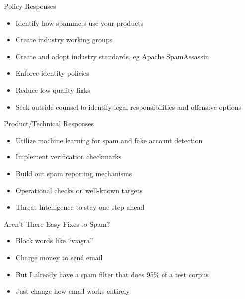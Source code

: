 \documentclass[nobackground,dvipsnames,table]{beamer}
\begin{document}
\begin{frame}{Policy Responses}
    \begin{itemize}
        \item Identify how spammers use your products
        \item Create industry working groups
        \item Create and adopt industry standards, eg Apache SpamAssassin
        \item Enforce identity policies
        \item Reduce low quality links
        \item Seek outside counsel to identify legal responsibilities and offensive options
    \end{itemize}
\end{frame}

\begin{frame}{Product/Technical Responses}
    \begin{itemize}
        \item Utilize machine learning for spam and fake account detection
        \item Implement verification checkmarks
        \item Build out spam reporting mechanisms
        \item Operational checks on well-known targets
        \item Threat Intelligence to stay one step ahead
    \end{itemize}
\end{frame}

\begin{frame}{Aren’t There Easy Fixes to Spam?}
    \begin{itemize}
        \item Block words like “viagra”
        \item Charge money to send email
        \item But I already have a spam filter that does 95\% of a test corpus
        \item Just change how email works entirely
    \end{itemize}
\end{frame}
\end{document}
